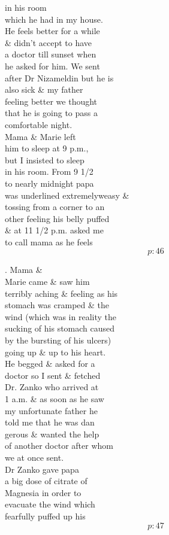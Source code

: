\documentclass{report}
\begin{document}
	\par{
 	in his room\ \\which he had in my house.\ \\He feels better for a while\ \\\& didn't accept to have\ \\a doctor till sunset when\ \\he asked for him. We sent\ \\after Dr Nizameldin but he is\ \\also sick \& my father\ \\feeling better we thought\ \\that he is going to pass a\ \\comfortable night.\ \\Mama \& Marie left\ \\him to sleep at 9 p.m.,\ \\but I insisted to sleep\ \\in his room. From 9 1/2\ \\to nearly midnight papa\ \\was \lbrack underlined extremely\rbrack weasy \&\ \\tossing from a corner to an\ \\other feeling his belly puffed\ \\\& at 11 1/2 p.m. asked me\ \\to call mama as he feels\ \\
  \[p: 46 \]

	}

	\par{
 	. Mama \&\ \\Marie came \& saw him\ \\terribly aching \& feeling as his\ \\stomach was cramped \& the\ \\wind (which was in reality the\ \\sucking of his stomach caused\ \\by the bursting of his ulcers)\ \\going up \& up to his heart.\ \\He begged \& asked for a\ \\doctor so I sent \& fetched\ \\Dr. Zanko who arrived at\ \\1 a.m. \& as soon as he saw\ \\my unfortunate father he\ \\told me that he was dan\ \\gerous \& wanted the help\ \\of another doctor after whom\ \\we at once sent.\ \\Dr Zanko gave papa\ \\a big dose of citrate of\ \\Magnesia in order to\ \\evacuate the wind which\ \\fearfully puffed up his\ \\
  \[p: 47 \]

	}
\end{document}
